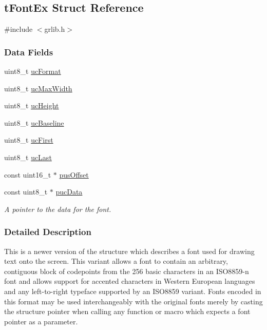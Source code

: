 \subsection{t\+Font\+Ex Struct Reference}
\label{structt_font_ex}


{\ttfamily \#include $<$grlib.\+h$>$}

\subsubsection*{Data Fields}
\begin{DoxyCompactItemize}
\item 
uint8\+\_\+t \hyperlink{structt_font_ex_a18d1466a68cd5673de8290372edf390e}{uc\+Format}
\item 
uint8\+\_\+t \hyperlink{structt_font_ex_a3f51fb84bffa3931869ea672dc6c52d1}{uc\+Max\+Width}
\item 
uint8\+\_\+t \hyperlink{structt_font_ex_a8baf5550b51a3d163c7ebd9dbff45ed0}{uc\+Height}
\item 
uint8\+\_\+t \hyperlink{structt_font_ex_a27e75a2228f0a32014b459eef7c34d3f}{uc\+Baseline}
\item 
uint8\+\_\+t \hyperlink{structt_font_ex_a1713d8f3dda1b6da85b7d35dbc6df056}{uc\+First}
\item 
uint8\+\_\+t \hyperlink{structt_font_ex_a255cd79c42ea16526ec00d19a0cc0b18}{uc\+Last}
\item 
const uint16\+\_\+t $\ast$ \hyperlink{structt_font_ex_aaab3266bca56077196a0f8025be5f7d4}{pus\+Offset}
\item 
const uint8\+\_\+t $\ast$ \hyperlink{structt_font_ex_a3c7bf575dfbc6a76bacfd57baa618b4f}{puc\+Data}
\begin{DoxyCompactList}\small\item\em A pointer to the data for the font. \end{DoxyCompactList}\end{DoxyCompactItemize}


\subsubsection{Detailed Description}
This is a newer version of the structure which describes a font used for drawing text onto the screen. This variant allows a font to contain an arbitrary, contiguous block of codepoints from the 256 basic characters in an I\+S\+O8859-\/n font and allows support for accented characters in Western European languages and any left-\/to-\/right typeface supported by an I\+S\+O8859 variant. Fonts encoded in this format may be used interchangeably with the original fonts merely by casting the structure pointer when calling any function or macro which expects a font pointer as a parameter. 

